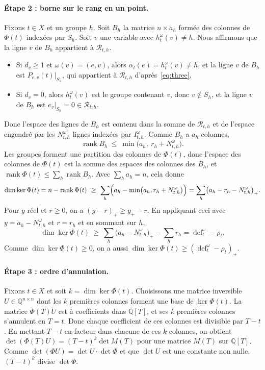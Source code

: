 \documentclass[11pt,a4paper]{article}
\theoremstyle{definition}
\theoremstyle{remark}
\newcommand{\Q}{\mathbb{Q}}
\newcommand{\cR}{\mathcal{R}}
\newcommand{\dfc}{\operatorname{def}}
\newcommand{\rank}{\operatorname{rank}}
\begin{document}
\paragraph{Étape 2 : borne sur le rang en un point.} Fixons $t\in X$ et un groupe $h$. Soit
$B_h$ la matrice $n\times a_h$ formée des colonnes de $\Phi(t)$ indexées par $S_h$. Soit $v$
une variable avec $h^\omega_t(v)\ne h$. Nous affirmons que la ligne $v$ de $B_h$ appartient
à $\cR_{t,h}$.
\begin{itemize}
\item Si $d_v\ge1$ et $\omega(v)=(e,v)$, alors $\alpha_t(e)=h^\omega_t(v)\ne h$, et la ligne
 $v$ de $B_h$ est $P_{e,v}(t)|_{S_h}$, qui appartient à $\cR_{t,h}$
 d'après~\eqref{eq:three}.
\item Si $d_v=0$, alors $h^\omega_t(v)$ est le groupe contenant $v$, donc $v\notin S_h$, et
 la ligne $v$ de $B_h$ est $e_v|_{S_h}=0\in\cR_{t,h}$.
\end{itemize}
Donc l'espace des lignes de $B_h$ est contenu dans la somme de $\cR_{t,h}$ et de l'espace
engendré par les $N^\omega_{t,h}$ lignes indexées par $I^\omega_{t,h}$. Comme $B_h$ a $a_h$
colonnes,
\[
\rank B_h\ \le\ \min\bigl(a_h,\ r_h+N^\omega_{t,h}\bigr).
\]
Les groupes forment une partition des colonnes de $\Phi(t)$, donc l'espace des colonnes de
$\Phi(t)$ est la somme des espaces des colonnes des $B_h$, et
$\rank\Phi(t)\le\sum_h\rank B_h$. Avec $\sum_ha_h=n$, cela donne
\[
\dim\ker\Phi(t)=n-\rank\Phi(t)\ \ge\ \sum_h\Bigl(a_h-\min\bigl(a_h,r_h+N^\omega_{t,h}\bigr)\Bigr)
=\sum_h\bigl(a_h-r_h-N^\omega_{t,h}\bigr)_+ .
\]
Pour $y$ réel et $r\ge0$, on a $(y-r)_+\ge y_+-r$. En appliquant ceci avec
$y=a_h-N^\omega_{t,h}$ et $r=r_h$ et en sommant sur $h$,
\[
\dim\ker\Phi(t)\ \ge\ \sum_h\bigl(a_h-N^\omega_{t,h}\bigr)_+-\sum_hr_h=\dfc^\omega_t-\rho_t .
\]
Comme $\dim\ker\Phi(t)\ge0$, on a aussi $\dim\ker\Phi(t)\ge(\dfc^\omega_t-\rho_t)_+$.

\paragraph{Étape 3 : ordre d'annulation.} Fixons $t\in X$ et soit $k=\dim\ker\Phi(t)$.
Choisissons une matrice inversible $U\in\Q^{n\times n}$ dont les $k$ premières colonnes
forment une base de $\ker\Phi(t)$. La matrice $\Phi(T)U$ est à coefficients dans $\Q[T]$, et
ses $k$ premières colonnes s'annulent en $T=t$. Donc chaque coefficient de ces colonnes est
divisible par $T-t$. En mettant $T-t$ en facteur dans chacune de ces $k$ colonnes, on
obtient $\det(\Phi(T)U)=(T-t)^k\det M(T)$ pour une matrice $M(T)$ sur $\Q[T]$. Comme
$\det(\Phi U)=\det U\cdot\det\Phi$ et que $\det U$ est une constante non nulle,
$(T-t)^{k}$ divise $\det\Phi$.
\end{document}
